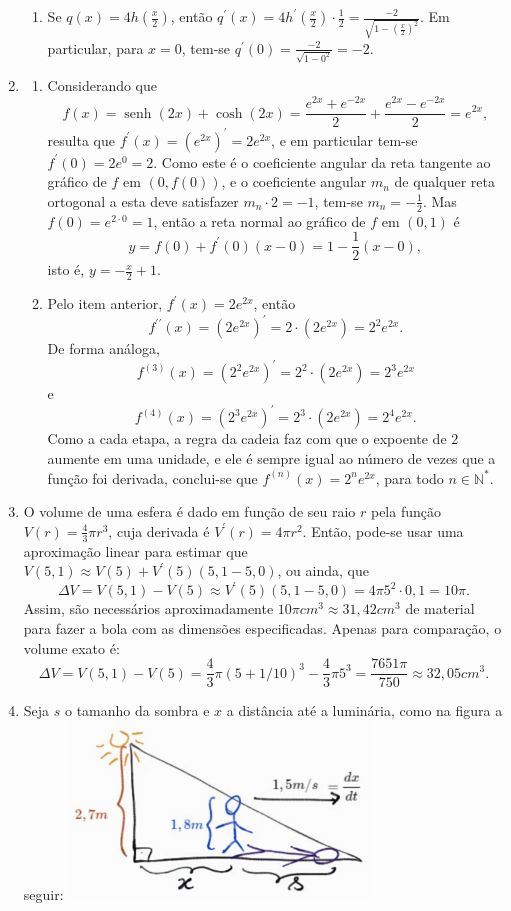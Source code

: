\documentclass[12pt,a4paper]{article}
\newcommand*\senh{\operatorname{senh}}
\begin{document}
\begin{enumerate}
\begin{enumerate}
\item Se $q(x) = 4h\left(\frac{x}{2}\right)$, então $q^\prime(x) = 4 h^\prime\left(\frac{x}{2}\right) \cdot \frac{1}{2} = \frac{-2}{ \sqrt{ 1 - \left(\frac{x}{2}\right)^2 } }$. Em particular, para $x = 0$, tem-se $q^\prime(0) = \frac{-2}{ \sqrt{ 1 - 0^2 } } = -2$.
\end{enumerate}
\item
\begin{enumerate}
\item Considerando que
\[
f(x) = \senh(2x) + \cosh(2x) = \frac{e^{2x} + e^{-2x}}{2} + \frac{e^{2x} - e^{-2x}}{2} = e^{2x},
\]
resulta que $f^\prime(x) = (e^{2x})^\prime = 2e^{2x}$, e em particular tem-se $f^\prime(0) = 2 e^{0} = 2$. Como este é o coeficiente angular da reta tangente ao gráfico de $f$ em $(0,f(0))$, e o coeficiente angular $m_n$ de qualquer reta ortogonal a esta deve satisfazer $m_n \cdot 2 = -1$, tem-se $m_n = -\frac{1}{2}$. Mas $f(0) = e^{2 \cdot 0} = 1$, então a reta normal ao gráfico de $f$ em $(0,1)$ é
\[
y = f(0) + f^\prime(0)(x-0) = 1 -\frac{1}{2}(x-0),
\]
isto é, $y = -\frac{x}{2} + 1$.
\item Pelo item anterior, $f^\prime(x) = 2e^{2x}$, então
\[
f^{\prime\prime}(x) = (2e^{2x})^\prime = 2 \cdot (2e^{2x}) = 2^2e^{2x}.
\]
De forma análoga,
\[
f^{(3)}(x) = (2^2e^{2x})^\prime = 2^2 \cdot (2e^{2x}) = 2^3e^{2x}
\]
e
\[
f^{(4)}(x) = (2^3e^{2x})^\prime = 2^3 \cdot (2e^{2x}) = 2^4e^{2x}.
\]
Como a cada etapa, a regra da cadeia faz com que o expoente de $2$ aumente em uma unidade, e ele é sempre igual ao número de vezes que a função foi derivada, conclui-se que $f^{(n)}(x) = 2^n e^{2x}$, para todo $n \in \mathbb{N}^*$.
\end{enumerate}

\item O volume de uma esfera é dado em função de seu raio $r$ pela função $V(r) = \frac{4}{3}\pi r^3$, cuja derivada é $V^\prime(r) = 4 \pi r^2$. Então, pode-se usar uma aproximação linear para estimar que $V(5,1) \approx V(5) + V^\prime(5)( 5,1 - 5,0 )$, ou ainda, que
\[
\Delta V
= V(5,1) - V(5)
\approx V^\prime(5)( 5,1 - 5,0 )
= 4 \pi 5^2 \cdot 0,1
= 10 \pi.
\]
Assim, são necessários aproximadamente $10 \pi cm^3 \approx 31,42 cm^3$ de material para fazer a bola com as dimensões especificadas. Apenas para comparação, o volume exato é:
\[
\Delta V
= V(5,1) - V(5)
= \frac{4}{3}\pi (5 +1/10)^3 - \frac{4}{3}\pi 5^3
= \frac{7651 \pi}{750}
\approx 32,05 cm^3.
\]


\item Seja $s$ o tamanho da sombra e $x$ a distância até a luminária, como na figura a seguir:
\includegraphics[width=8.0cm]{img/prova-2-tads-sombra}


\end{enumerate}
\end{document}
